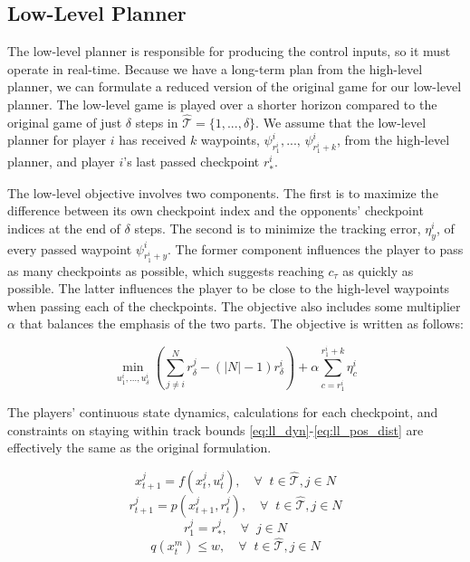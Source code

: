 \subsection{Low-Level Planner}
The low-level planner is responsible for producing the control inputs, so it must operate in real-time. Because we have a long-term plan from the high-level planner, we can formulate a reduced version of the original game for our low-level planner. The low-level game is played over a shorter horizon compared to the original game of just $\delta$ steps in $\hat{\mathcal{T}} = \{1, ..., \delta\}$. We assume that the low-level planner for player $i$ has received $k$ waypoints, $\psi^i_{r^i_{1}}, ..., \, \psi^i_{r^i_{1} + k}$, from the high-level planner, and player $i$'s last passed checkpoint $r^i_*$. 

The low-level objective involves two components. The first is to maximize the difference between its own checkpoint index and the opponents' checkpoint indices at the end of $\delta$ steps. The second is to minimize the tracking error, $\eta^i_y$, of every passed waypoint $\psi^i_{r^i_{1}+y}$. The former component influences the player to pass as many checkpoints as possible, which suggests reaching $c_\tau$ as quickly as possible. The latter influences the player to be close to the high-level waypoints when passing each of the checkpoints. The objective also includes some multiplier $\alpha$ that balances the emphasis of the two parts. The objective is written as follows:

\begin{equation} \label{eq:ll_obj}
    \min_{u^i_{1}, ..., u^i_{\delta}} (\sum^N_{j \neq i}r^j_{\delta} - (|N|-1) r^i_{\delta}) + \alpha \sum_{c={r^i_{1}}}^{{r^i_{1}}+k} \eta^i_c
\end{equation}

The players' continuous state dynamics, calculations for each checkpoint, and constraints on staying within track bounds \eqref{eq:ll_dyn}-\eqref{eq:ll_pos_dist} are effectively the same as the original formulation. 

\begin{equation} \label{eq:ll_dyn}
    x^j_{t+1} = f(x^j_{t}, u^j_t), \quad \forall \;\; t \in \hat{\mathcal{T}}, j \in N
\end{equation}
\begin{equation} \label{eq::ll_pos}
    r^j_{t+1} = p(x^j_{t+1}, r^j_t), \quad \forall \;\; t \in \hat{\mathcal{T}}, j \in N
\end{equation}
\begin{equation} \label{eq::ll_pos_init}
    r^j_{1} = r^j_*, \quad \forall\;\; j \in N
\end{equation}
\begin{equation} \label{eq:ll_pos_dist}
    q(x^m_{t}) \leq w, \quad \forall \;\; t \in \hat{\mathcal{T}}, j \in N
\end{equation}

